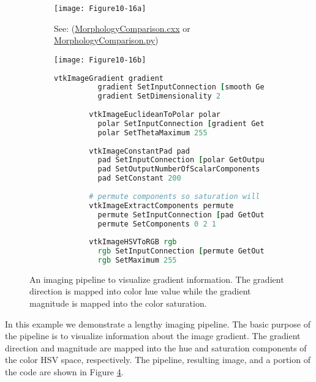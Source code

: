 \begin{figure}[htb]
    \centering
	\begin{subfigure}[h]{0.48\linewidth}
		\texttt{[image: Figure10-16a]}
		\captionsetup{justification=centering}
		\caption*{See: (\href{https://lorensen.github.io/VTKExamples/site/Cxx/ImageProcessing/MorphologyComparison/}{MorphologyComparison.cxx} or \href{https://lorensen.github.io/VTKExamples/site/Python/ImageProcessing/MorphologyComparison/}{MorphologyComparison.py})}
		\label{fig:Figure10-16a}
	\end{subfigure}
	\hfill
	\begin{subfigure}[h]{0.48\linewidth}
		\texttt{[image: Figure10-16b]}
		\captionsetup{justification=centering}
		\caption*{}
        \label{fig:Figure10-16b}
	\end{subfigure}
	\hfill
	\begin{subfigure}[h]{0.96\linewidth}
       \begin{lstlisting}[language=TCL,  caption={}, numbers=none, frame=none]
        vtkImageGradient gradient
          gradient SetInputConnection [smooth GetOutputPort]
          gradient SetDimensionality 2
        
        vtkImageEuclideanToPolar polar
          polar SetInputConnection [gradient GetOutputPort]
          polar SetThetaMaximum 255
        
        vtkImageConstantPad pad
          pad SetInputConnection [polar GetOutputPort]
          pad SetOutputNumberOfScalarComponents 3
          pad SetConstant 200
        
        # permute components so saturation will be constant
        vtkImageExtractComponents permute
          permute SetInputConnection [pad GetOutputPort]
          permute SetComponents 0 2 1
          
        vtkImageHSVToRGB rgb
          rgb SetInputConnection [permute GetOutputPort]
          rgb SetMaximum 255
          \end{lstlisting}
        \label{fig:Figure10-16d}
	\end{subfigure}
	\caption{An imaging pipeline to visualize gradient information. The gradient direction is mapped into color hue value while the gradient magnitude is mapped into the color saturation.}\label{fig:Figure10-16}
\end{figure}

In this example we demonstrate a lengthy imaging pipeline. The basic purpose of the pipeline is to visualize information about the image gradient. The gradient direction and magnitude are mapped into the hue and saturation components of the color HSV space, respectively. The pipeline, resulting image, and a portion of the code are shown in Figure \ref{fig:Figure10-16}.

